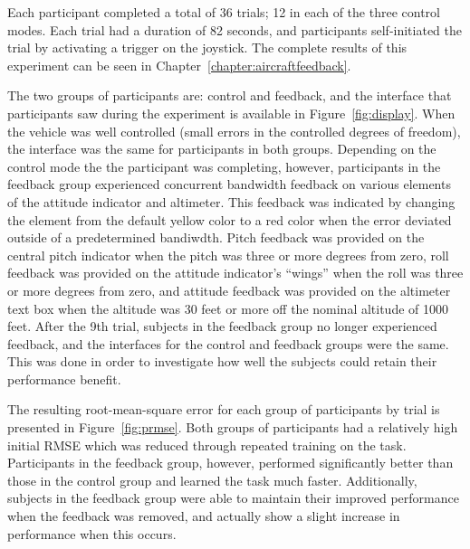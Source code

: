 Each participant completed a total of 36 trials; 12 in each of the three control modes.
Each trial had a duration of 82 seconds, and participants self-initiated the trial by activating a trigger on the joystick.
The complete results of this experiment can be seen in Chapter~\ref{chapter:aircraftfeedback}.

The two groups of participants are: control and feedback, and the interface that participants saw during the experiment is available in Figure~\ref{fig:display}.
When the vehicle was well controlled (small errors in the controlled degrees of freedom), the interface was the same for participants in both groups.
Depending on the control mode the the participant was completing, however, participants in the feedback group experienced concurrent bandwidth feedback on various elements of the attitude indicator and altimeter.
This feedback was indicated by changing the element from the default yellow color to a red color when the error deviated outside of a predetermined bandiwdth.
Pitch feedback was provided on the central pitch indicator when the pitch was three or more degrees from zero, roll feedback was provided on the attitude indicator's ``wings'' when the roll was three or more degrees from zero, and attitude feedback was provided on the altimeter text box when the altitude was 30 feet or more off the nominal altitude of 1000 feet.
After the 9th trial, subjects in the feedback group no longer experienced feedback, and the interfaces for the control and feedback groups were the same.
This was done in order to investigate how well the subjects could retain their performance benefit.

The resulting root-mean-square error for each group of participants by trial is presented in Figure~\ref{fig:prmse}.
Both groups of participants had a relatively high initial RMSE which was reduced through repeated training on the task.
Participants in the feedback group, however, performed significantly better than those in the control group and learned the task much faster.
Additionally, subjects in the feedback group were able to maintain their improved performance when the feedback was removed, and actually show a slight increase in performance when this occurs.

